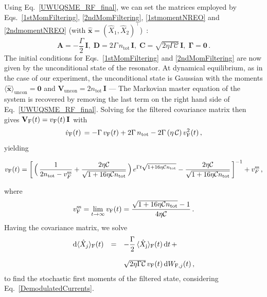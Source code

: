 \documentclass[./Main-revtex.tex]{subfiles}
\begin{document}
Using Eq.~\eqref{UWUQSME_RF_final}, we can set the matrices employed by Eqs.~\eqref{1stMomFiltering}, \eqref{2ndMomFiltering}, \eqref{1stmomentNREO} and \eqref{2ndmomentNREO} (with $\hat{\mathbf{x}}=(\hat{X}_1,\hat{X}_2)^\top$)~\cite{laverick2021linear}:
\begin{equation}
     \mathbf{A}=-\dfrac{\Gamma}{2}\,\mathbf{I},\;\mathbf{D}=
    2\Gamma\,n_\text{tot}\,\mathbf{I},\;\mathbf{C}=\sqrt{2\eta\Gamma \mathcal{C}}\,\mathbf{I},\;\bm{\Gamma}=\mathbf{0}\,.
\label{IPmatrices}
\end{equation}
The initial conditions for Eqs.~\eqref{1stMomFiltering} and \eqref{2ndMomFiltering} are now given by the unconditional state of the resonator. At dynamical equilibrium, as in the case of our experiment, the unconditional state is Gaussian with the moments $\langle \hat{\mathbf{x}} \rangle _\text{uncon} = \mathbf{0}$ and $\mathbf{V}_\text{uncon}=2n_\text{tot}\,\mathbf{I}$ --- The Markovian master equation of the system is recovered by removing the last term on the right hand side of Eq.~\eqref{UWUQSME_RF_final}. Solving for the filtered covariance matrix then gives $\mathbf{V}_{\text F}(t)=v_{\text F}(t)\,\mathbf{I}$ with
\begin{equation}
    \dot{v}_{\text F}(t)\,=-\Gamma\,v_{\text F}(t)+2\Gamma\,n_\text{tot}-2\Gamma\,(\eta\,\mathcal{C})\,v^2_{\text F}(t)\,,
    \label{NLODE}
\end{equation}
yielding
\begin{widetext}
\begin{equation}
    v_{\text F}(t)=\bigg[\,\Big(\,\dfrac{1}{2n_\text{tot}-v_F^{\rm ss}}+\dfrac{2\eta \mathcal{C}}{\sqrt{1+16\eta \mathcal{C} n_\text{tot}}}\,\Big)\,e^{\Gamma t \sqrt{1+16\eta \mathcal{C} n_\text{tot}} }-\dfrac{2\eta \mathcal{C}}{\sqrt{1+16\eta \mathcal{C} n_\text{tot}} }\,\bigg]^{-1}+v_F^{\rm ss}\,,
    \label{VFT}
\end{equation}
\end{widetext}
where
\begin{equation}
    v_{\text F}^{\rm ss}=\lim_{t\to\infty}v_{\text F}(t)=\dfrac{\sqrt{1+16\eta \mathcal{C} n_\text{tot}}-1}{4\eta \mathcal{C}}\,.
     \label{VFSS}
\end{equation}
Having the covariance matrix, we solve
\begin{equation}
\begin{array}{rll}
    {\rm d}\langle \hat{X}_j \rangle_{\text F}(t) & = & -\dfrac{\Gamma}{2}\,\langle\hat{X}_\text{j} \rangle_{\text F}(t)\,{\rm d} t\,+ \\ && \\&&\sqrt{2\eta\Gamma \mathcal{C}}\,v_{\text F}(t)\,{\rm d} W_{{\rm F},j}(t)\,,
\end{array}
\label{equ:rFT}
\end{equation}
to find the stochastic first moments of the filtered state, considering Eq.~\eqref{DemodulatedCurrents}.
\end{document}
